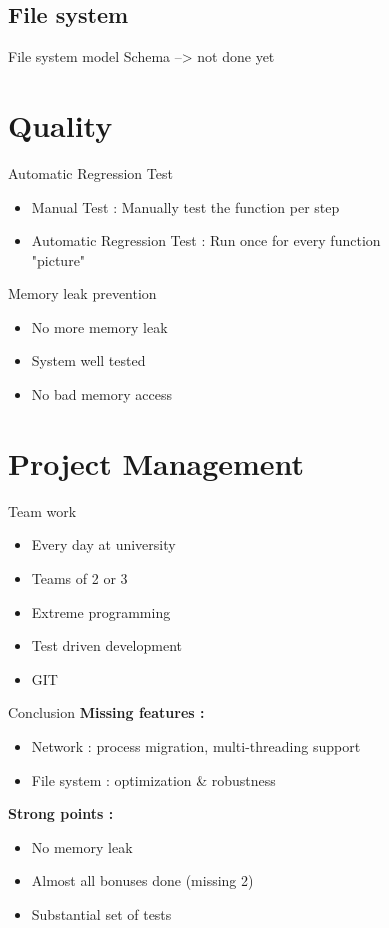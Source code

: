\documentclass{beamer}
\begin{document}
\subsection{File system}
\begin{frame}{File system model}
    Schema --> not done yet
\end{frame}

\section{Quality}
\begin{frame}{Automatic Regression Test}
  \begin{itemize}
    \item Manual Test : Manually test the function per step
    \item Automatic Regression Test : Run once for every function
    \\"picture"
  \end{itemize}
\end{frame}

\begin{frame}{Memory leak prevention}
  \begin{itemize}
    \item No more memory leak
    \item System well tested
    \item No bad memory access
  \end{itemize}
\end{frame}

\section{Project Management}
\begin{frame}{Team work}
   \begin{itemize}
       \item Every day at university
       \item Teams of 2 or 3
       \item Extreme programming
       \item Test driven development
       \item GIT
   \end{itemize} 
\end{frame}

\begin{frame}{Conclusion}
    \textbf{Missing features :}
    \begin{itemize}
        \item Network : process migration, multi-threading support
        \item File system : optimization \& robustness
    \end{itemize}

    \textbf{Strong points :}
    \begin{itemize}
        \item No memory leak
        \item Almost all bonuses done (missing 2)
        \item Substantial set of tests
    \end{itemize}
\end{frame}
\end{document}
